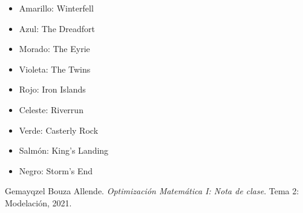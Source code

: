 \documentclass[a4paper,10pt,twocolumn]{article}
\theoremstyle{theorem}
\theoremstyle{definition}
\theoremstyle{remark}
\begin{document}
\begin{itemize}

	\item Amarillo: Winterfell
	\item Azul: The Dreadfort
	\item Morado: The Eyrie
	\item Violeta: The Twins
	\item Rojo: Iron Islands
	\item Celeste: Riverrun
	\item Verde: Casterly Rock
	\item Salmón: King's Landing
	\item Negro: Storm's End

\end{itemize}


\begin{thebibliography}{99}
	
	 Gemayqzel Bouza Allende. \emph{Optimización Matemática I: Nota de clase}.
		Tema 2: Modelación, 2021.

\end{thebibliography}

\label{end}
\end{document}
